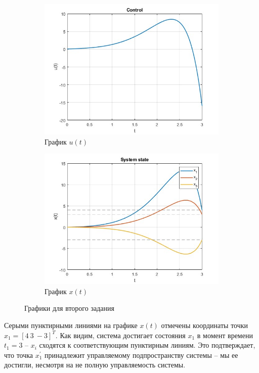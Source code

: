 \documentclass[a4paper, 12pt]{article}
\begin{document}
    \begin{figure}[H]
        \centering
        \begin{subfigure}{0.45\textwidth}
            \centering
            \includegraphics[width=\linewidth]{task_2_u_t.jpg}
            \caption{График $u(t)$}
            \label{fig:task_2_u_t}
        \end{subfigure}
        \hfill
        \begin{subfigure}{0.45\textwidth}
            \centering
            \includegraphics[width=\linewidth]{task_2_x_t.jpg}
            \caption{График $x(t)$}
            \label{fig:task_2_x_t}
        \end{subfigure}
        \caption{Графики для второго задания}
        \label{fig:task_2_modeling}
    \end{figure}
    \noindent Серыми пунктирными линиями на графике $x(t)$ отмечены координаты точки $x_1=\left[4\ 3\ -3\right]^T$.
    Как видим, система достигает состояния $x_1$ в момент времени $t_1=3$ -- $x_i$ сходятся к соответствующим пунктирным линиям.
    Это подтверждает, что точка $x_1^{\prime}$ принадлежит управляемому подпространству системы -- мы ее достигли, несмотря на не полную управляемость системы.
\end{document}
